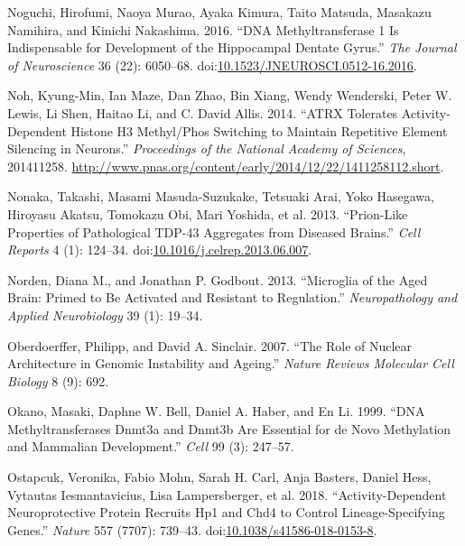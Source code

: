\documentclass[onehalf,12pt]{beavtex}
\begin{document}
  \hypertarget{ref-NoguchiDNAMethyltransferaseIndispensable2016}{}
  Noguchi, Hirofumi, Naoya Murao, Ayaka Kimura, Taito Matsuda, Masakazu
  Namihira, and Kinichi Nakashima. 2016. ``DNA Methyltransferase 1 Is
  Indispensable for Development of the Hippocampal Dentate Gyrus.''
  \emph{The Journal of Neuroscience} 36 (22): 6050--68.
  doi:\href{https://doi.org/10.1523/JNEUROSCI.0512-16.2016}{10.1523/JNEUROSCI.0512-16.2016}.
  
  \hypertarget{ref-NohATRXtoleratesactivitydependent2014}{}
  Noh, Kyung-Min, Ian Maze, Dan Zhao, Bin Xiang, Wendy Wenderski, Peter W.
  Lewis, Li Shen, Haitao Li, and C. David Allis. 2014. ``ATRX Tolerates
  Activity-Dependent Histone H3 Methyl/Phos Switching to Maintain
  Repetitive Element Silencing in Neurons.'' \emph{Proceedings of the
  National Academy of Sciences}, 201411258.
  \url{http://www.pnas.org/content/early/2014/12/22/1411258112.short}.
  
  \hypertarget{ref-NonakaPrionlikePropertiesPathological2013}{}
  Nonaka, Takashi, Masami Masuda-Suzukake, Tetsuaki Arai, Yoko Hasegawa,
  Hiroyasu Akatsu, Tomokazu Obi, Mari Yoshida, et al. 2013. ``Prion-Like
  Properties of Pathological TDP-43 Aggregates from Diseased Brains.''
  \emph{Cell Reports} 4 (1): 124--34.
  doi:\href{https://doi.org/10.1016/j.celrep.2013.06.007}{10.1016/j.celrep.2013.06.007}.
  
  \hypertarget{ref-NordenMicrogliaagedbrain2013}{}
  Norden, Diana M., and Jonathan P. Godbout. 2013. ``Microglia of the Aged
  Brain: Primed to Be Activated and Resistant to Regulation.''
  \emph{Neuropathology and Applied Neurobiology} 39 (1): 19--34.
  
  \hypertarget{ref-Oberdoerfferrolenucleararchitecture2007}{}
  Oberdoerffer, Philipp, and David A. Sinclair. 2007. ``The Role of
  Nuclear Architecture in Genomic Instability and Ageing.'' \emph{Nature
  Reviews Molecular Cell Biology} 8 (9): 692.
  
  \hypertarget{ref-OkanoDNAmethyltransferasesDnmt3a1999}{}
  Okano, Masaki, Daphne W. Bell, Daniel A. Haber, and En Li. 1999. ``DNA
  Methyltransferases Dnmt3a and Dnmt3b Are Essential for de Novo
  Methylation and Mammalian Development.'' \emph{Cell} 99 (3): 247--57.
  
  \hypertarget{ref-OstapcukActivitydependentneuroprotectiveprotein2018}{}
  Ostapcuk, Veronika, Fabio Mohn, Sarah H. Carl, Anja Basters, Daniel
  Hess, Vytautas Iesmantavicius, Lisa Lampersberger, et al. 2018.
  ``Activity-Dependent Neuroprotective Protein Recruits Hp1 and Chd4 to
  Control Lineage-Specifying Genes.'' \emph{Nature} 557 (7707): 739--43.
  doi:\href{https://doi.org/10.1038/s41586-018-0153-8}{10.1038/s41586-018-0153-8}.
  
\end{document}
